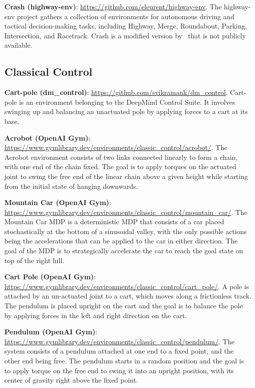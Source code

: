 \documentclass[10pt]{article} %
\theoremstyle{definition}
\begin{document}
\textbf{Crash (highway-env)}: \url{https://github.com/eleurent/highway-env}. The highway-env project gathers a collection of environments for autonomous driving and tactical decision-making tasks, including Highway, Merge, Roundabout, Parking, Intersection, and Racetrack. Crash is a modified version by~\citep{dingGeneralizingGoalConditionedReinforcement2022a} that is not publicly available.  

\subsection{Classical Control}
\textbf{Cart-pole (dm\_control)}: \url{https://github.com/svikramank/dm\_control}. Cart-pole is an environment belonging to the DeepMind Control Suite. It involves swinging up and balancing an unactuated pole by applying forces to a cart at its base.

\textbf{Acrobot (OpenAI Gym)}: \url{https://www.gymlibrary.dev/environments/classic_control/acrobot/}. The Acrobot environment consists of two links connected linearly to form a chain, with one end of the chain fixed. The goal is to apply torques on the actuated joint to swing the free end of the linear chain above a given height while starting from the initial state of hanging downwards.

\textbf{Mountain Car (OpenAI Gym)}: \url{https://www.gymlibrary.dev/environments/classic_control/mountain_car/}. The Mountain Car MDP is a deterministic MDP that consists of a car placed stochastically at the bottom of a sinusoidal valley, with the only possible actions being the accelerations that can be applied to the car in either direction. The goal of the MDP is to strategically accelerate the car to reach the goal state on top of the right hill.

\textbf{Cart Pole (OpenAI Gym)}: \url{https://www.gymlibrary.dev/environments/classic_control/cart_pole/}. A pole is attached by an un-actuated joint to a cart, which moves along a frictionless track. The pendulum is placed upright on the cart and the goal is to balance the pole by applying forces in the left and right direction on the cart.

\textbf{Pendulum (OpenAI Gym)}: \url{https://www.gymlibrary.dev/environments/classic_control/pendulum/}. The system consists of a pendulum attached at one end to a fixed point, and the other end being free. The pendulum starts in a random position and the goal is to apply torque on the free end to swing it into an upright position, with its center of gravity right above the fixed point.
\end{document}
